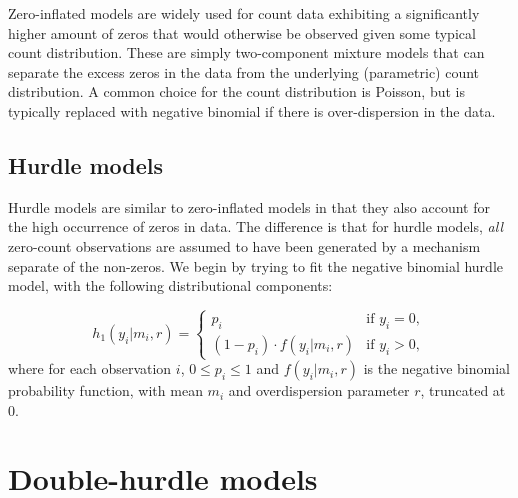 \documentclass[article]{jss}
\begin{document}
Zero-inflated models are widely used for count data exhibiting a significantly higher amount of zeros that would otherwise be observed given some typical count distribution. These are simply two-component mixture models that can separate the excess zeros in the data from the underlying (parametric) count distribution. A common choice for the count distribution is Poisson, but is typically replaced with negative binomial if there is over-dispersion in the data.

\subsection{Hurdle models}

Hurdle models are similar to zero-inflated models in that they also account for the high occurrence of zeros in data. The difference is that for hurdle models, \textit{all} zero-count observations are assumed to have been generated by a mechanism separate of the non-zeros. We begin by trying to fit the negative binomial hurdle model, with the following distributional components:

\begin{equation}
\label{nbhurdle}
  h_1(y_i | m_i,r) = 
  \begin{cases}
  p_i & \mbox{if } y_i=0,\\
  (1-p_i)\cdot f(y_i | m_i,r) & \mbox{if } y_i>0,
  \end{cases}
\end{equation}
where for each observation $i$, $0 \le p_i \le 1$ and $f(y_i | m_i,r)$ is the negative binomial probability function, with mean $m_i$ and overdispersion parameter $r$, truncated at 0.


\section{Double-hurdle models}



\end{document}

